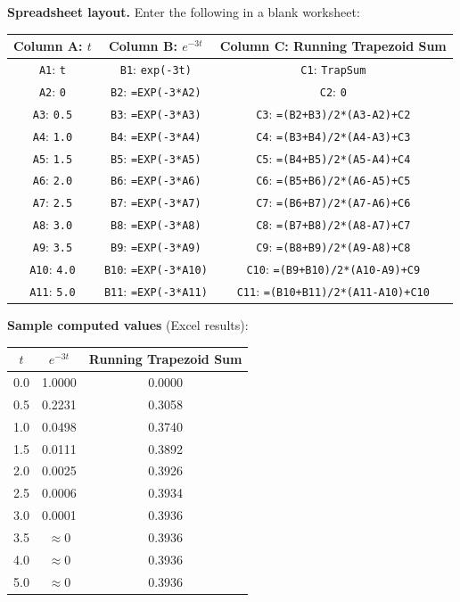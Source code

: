 \documentclass[12pt,a4paper]{article}
\begin{document}
\medskip
\noindent\textbf{Spreadsheet layout.} Enter the following in a blank worksheet:

\medskip
\begin{center}
\begin{tabular}{@{}ccc@{}}
\toprule
\textbf{Column A}: $t$ &
\textbf{Column B}: $e^{-3t}$ &
\textbf{Column C}: Running Trapezoid Sum \\
\midrule
\texttt{A1}: \texttt{t}   & \texttt{B1}: \texttt{exp(-3t)}   & \texttt{C1}: \texttt{TrapSum} \\
\texttt{A2}: \texttt{0}   & \texttt{B2}: \texttt{=EXP(-3*A2)} & \texttt{C2}: \texttt{0} \\
\texttt{A3}: \texttt{0.5} & \texttt{B3}: \texttt{=EXP(-3*A3)} & \texttt{C3}: \texttt{=(B2+B3)/2*(A3-A2)+C2} \\
\texttt{A4}: \texttt{1.0} & \texttt{B4}: \texttt{=EXP(-3*A4)} & \texttt{C4}: \texttt{=(B3+B4)/2*(A4-A3)+C3} \\
\texttt{A5}: \texttt{1.5} & \texttt{B5}: \texttt{=EXP(-3*A5)} & \texttt{C5}: \texttt{=(B4+B5)/2*(A5-A4)+C4} \\
\texttt{A6}: \texttt{2.0} & \texttt{B6}: \texttt{=EXP(-3*A6)} & \texttt{C6}: \texttt{=(B5+B6)/2*(A6-A5)+C5} \\
\texttt{A7}: \texttt{2.5} & \texttt{B7}: \texttt{=EXP(-3*A7)} & \texttt{C7}: \texttt{=(B6+B7)/2*(A7-A6)+C6} \\
\texttt{A8}: \texttt{3.0} & \texttt{B8}: \texttt{=EXP(-3*A8)} & \texttt{C8}: \texttt{=(B7+B8)/2*(A8-A7)+C7} \\
\texttt{A9}: \texttt{3.5} & \texttt{B9}: \texttt{=EXP(-3*A9)} & \texttt{C9}: \texttt{=(B8+B9)/2*(A9-A8)+C8} \\
\texttt{A10}: \texttt{4.0}& \texttt{B10}: \texttt{=EXP(-3*A10)}& \texttt{C10}: \texttt{=(B9+B10)/2*(A10-A9)+C9} \\
\texttt{A11}: \texttt{5.0}& \texttt{B11}: \texttt{=EXP(-3*A11)}& \texttt{C11}: \texttt{=(B10+B11)/2*(A11-A10)+C10} \\
\bottomrule
\end{tabular}
\end{center}

\medskip
\noindent\textbf{Sample computed values} (Excel results):

\medskip
\begin{center}
\begin{tabular}{@{}ccc@{}}
\toprule
$t$ & $e^{-3t}$ & Running Trapezoid Sum \\
\midrule
0.0 & 1.0000 & 0.0000 \\
0.5 & 0.2231 & 0.3058 \\
1.0 & 0.0498 & 0.3740 \\
1.5 & 0.0111 & 0.3892 \\
2.0 & 0.0025 & 0.3926 \\
2.5 & 0.0006 & 0.3934 \\
3.0 & 0.0001 & 0.3936 \\
3.5 & $\approx 0$ & 0.3936 \\
4.0 & $\approx 0$ & 0.3936 \\
5.0 & $\approx 0$ & 0.3936 \\
\bottomrule
\end{tabular}
\end{center}
\end{document}
